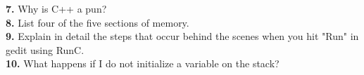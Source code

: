 \documentclass[12pt,extarticle]{article}
\begin{document}
\noindent
\textbf{7.} Why is C++ a pun?\\

\noindent
\textbf{8.} List four of the five sections of memory.\\

\noindent
\textbf{9.} Explain in detail the steps that occur behind the scenes when you hit "Run" in gedit using RunC.\\

\noindent
\textbf{10.} What happens if I do not initialize a variable on the stack?\\
\end{document}
